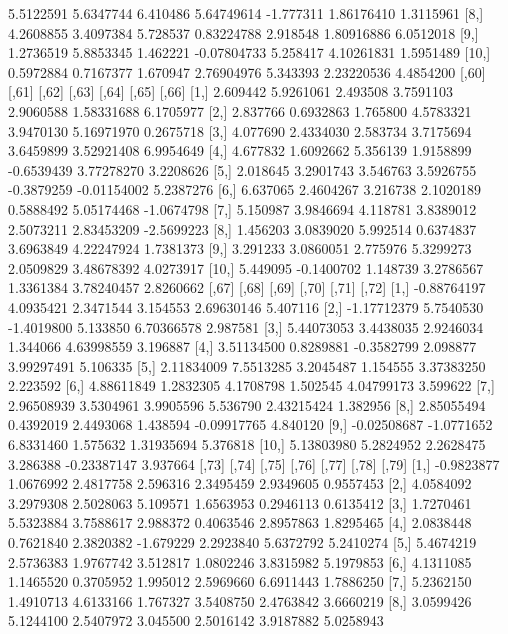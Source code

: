 \documentclass[12pt]{article}
\begin{document}
\begin{Schunk}
\begin{Soutput}
 [7,] 5.5122591 5.6347744  6.410486  5.64749614 -1.777311 1.86176410  1.3115961
 [8,] 4.2608855 3.4097384  5.728537  0.83224788  2.918548 1.80916886  6.0512018
 [9,] 1.2736519 5.8853345  1.462221 -0.07804733  5.258417 4.10261831  1.5951489
[10,] 0.5972884 0.7167377  1.670947  2.76904976  5.343393 2.23220536  4.4854200
         [,60]      [,61]    [,62]     [,63]      [,64]       [,65]      [,66]
 [1,] 2.609442  5.9261061 2.493508 3.7591103  2.9060588  1.58331688  6.1705977
 [2,] 2.837766  0.6932863 1.765800 4.5783321  3.9470130  5.16971970  0.2675718
 [3,] 4.077690  2.4334030 2.583734 3.7175694  3.6459899  3.52921408  6.9954649
 [4,] 4.677832  1.6092662 5.356139 1.9158899 -0.6539439  3.77278270  3.2208626
 [5,] 2.018645  3.2901743 3.546763 3.5926755 -0.3879259 -0.01154002  5.2387276
 [6,] 6.637065  2.4604267 3.216738 2.1020189  0.5888492  5.05174468 -1.0674798
 [7,] 5.150987  3.9846694 4.118781 3.8389012  2.5073211  2.83453209 -2.5699223
 [8,] 1.456203  3.0839020 5.992514 0.6374837  3.6963849  4.22247924  1.7381373
 [9,] 3.291233  3.0860051 2.775976 5.3299273  2.0509829  3.48678392  4.0273917
[10,] 5.449095 -0.1400702 1.148739 3.2786567  1.3361384  3.78240457  2.8260662
            [,67]      [,68]      [,69]    [,70]       [,71]    [,72]
 [1,] -0.88764197  4.0935421  2.3471544 3.154553  2.69630146 5.407116
 [2,] -1.17712379  5.7540530 -1.4019800 5.133850  6.70366578 2.987581
 [3,]  5.44073053  3.4438035  2.9246034 1.344066  4.63998559 3.196887
 [4,]  3.51134500  0.8289881 -0.3582799 2.098877  3.99297491 5.106335
 [5,]  2.11834009  7.5513285  3.2045487 1.154555  3.37383250 2.223592
 [6,]  4.88611849  1.2832305  4.1708798 1.502545  4.04799173 3.599622
 [7,]  2.96508939  3.5304961  3.9905596 5.536790  2.43215424 1.382956
 [8,]  2.85055494  0.4392019  2.4493068 1.438594 -0.09917765 4.840120
 [9,] -0.02508687 -1.0771652  6.8331460 1.575632  1.31935694 5.376818
[10,]  5.13803980  5.2824952  2.2628475 3.286388 -0.23387147 3.937664
           [,73]     [,74]     [,75]     [,76]     [,77]     [,78]     [,79]
 [1,] -0.9823877 1.0676992 2.4817758  2.596316 2.3495459 2.9349605 0.9557453
 [2,]  4.0584092 3.2979308 2.5028063  5.109571 1.6563953 0.2946113 0.6135412
 [3,]  1.7270461 5.5323884 3.7588617  2.988372 0.4063546 2.8957863 1.8295465
 [4,]  2.0838448 0.7621840 2.3820382 -1.679229 2.2923840 5.6372792 5.2410274
 [5,]  5.4674219 2.5736383 1.9767742  3.512817 1.0802246 3.8315982 5.1979853
 [6,]  4.1311085 1.1465520 0.3705952  1.995012 2.5969660 6.6911443 1.7886250
 [7,]  5.2362150 1.4910713 4.6133166  1.767327 3.5408750 2.4763842 3.6660219
 [8,]  3.0599426 5.1244100 2.5407972  3.045500 2.5016142 3.9187882 5.0258943

\end{Soutput}
\end{Schunk}
\end{document}
